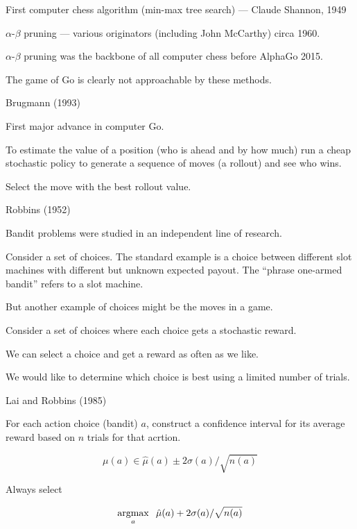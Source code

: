{\vfill


First computer chess algorithm (min-max tree search) --- Claude Shannon, 1949

\vfill
$\alpha$-$\beta$ pruning --- various originators (including John McCarthy) circa 1960.

\vfill
$\alpha$-$\beta$ pruning was the backbone of all computer chess before AlphaGo 2015.

\vfill
The game of Go is clearly not approachable by these methods.

{Brugmann (1993)}

First major advance in computer Go.

\vfill
To estimate the value of a position (who is ahead and by how much)
run a cheap stochastic policy to generate a sequence of moves (a rollout) and see who wins.

\vfill
Select the move with the best rollout value.

{Robbins (1952)}

Bandit problems were studied in an independent line of research.

\vfill
Consider a set of choices.  The standard example is a choice between different slot machines with different but unknown expected payout.
The ``phrase one-armed bandit'' refers to a slot machine.

\vfill
But another example of choices might be the moves in a game.


\vfill
Consider a set of choices where each choice gets a stochastic reward.

\vfill
We can select a choice and get a reward as often as we like.

\vfill
We would like to determine which choice is best using a limited number of trials.

{Lai and Robbins (1985)}

For each action choice (bandit) $a$, construct a confidence interval for its average reward
based on $n$ trials for that acrtion.

\vfill
$$\mu(a) \in \hat{\mu}(a) \pm 2\sigma(a)/\sqrt{n(a)}$$

\vfill
Always select

$$\operatorname*{argmax}_a \;\; \hat{\mu}(a) + 2\sigma(a)/\sqrt{n(a)}$$

}

